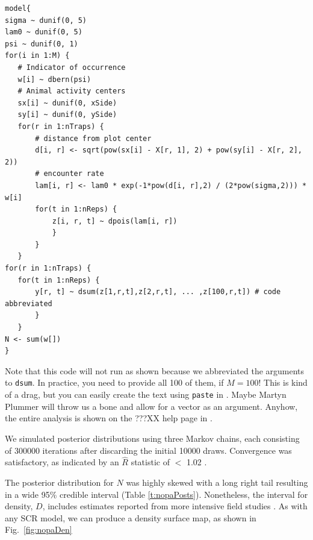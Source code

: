 \begin{small}
\begin{verbatim}
model{
sigma ~ dunif(0, 5)
lam0 ~ dunif(0, 5)
psi ~ dunif(0, 1)
for(i in 1:M) {
   # Indicator of occurrence
   w[i] ~ dbern(psi)
   # Animal activity centers
   sx[i] ~ dunif(0, xSide)
   sy[i] ~ dunif(0, ySide)
   for(r in 1:nTraps) {
       # distance from plot center
       d[i, r] <- sqrt(pow(sx[i] - X[r, 1], 2) + pow(sy[i] - X[r, 2], 2))
       # encounter rate
       lam[i, r] <- lam0 * exp(-1*pow(d[i, r],2) / (2*pow(sigma,2))) * w[i]
       for(t in 1:nReps) {
           z[i, r, t] ~ dpois(lam[i, r])
           }
       }
   }
for(r in 1:nTraps) {
   for(t in 1:nReps) {
       y[r, t] ~ dsum(z[1,r,t],z[2,r,t], ... ,z[100,r,t]) # code abbreviated
       }
   }
N <- sum(w[])
}
\end{verbatim}
\end{small}

Note that this code will not run as shown because we abbreviated the
arguments to \verb+dsum+. In practice, you need to provide all 100 of
them, if $M=100$! This is kind of a drag, but you can easily create
the text using \verb+paste+ in \R. Maybe Martyn Plummer will throw us
a bone and allow for a vector as an argument. Anyhow, the entire
analysis is shown on the ???XX help page in \scrbook.


We simulated posterior
distributions using three Markov chains,
each consisting of 300000 iterations after discarding the initial 10000
draws. Convergence was satisfactory, as indicated by an $\hat{R}$
statistic of $<$ 1.02 \citep{gelman_rubin:1992}.


The posterior distribution for
$N$ was highly skewed with a long right tail resulting in a wide 95\%
credible interval (Table \ref{t:nopaPosts}). Nonetheless, the interval
for density, $D$, includes estimates reported from more intensive field
studies \citep{moldenhaer_regelski:1996}. As with any SCR model,
we can produce a density surface map, as shown in Fig.~\ref{fig:nopaDen}


